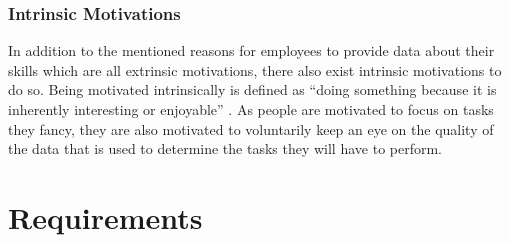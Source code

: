\subsubsection{Intrinsic Motivations}
In addition to the mentioned reasons for employees to provide data about their skills which are all extrinsic motivations,
there also exist intrinsic motivations to do so. Being motivated intrinsically is defined as ``doing something because it is inherently interesting or enjoyable'' \cite{RYAN200054}. As people are motivated to focus on tasks they fancy, they are also motivated to voluntarily keep an eye on the quality of the data that is used to determine the tasks they will have to perform.

\newpage

\section{Requirements}

\label{requirements}
